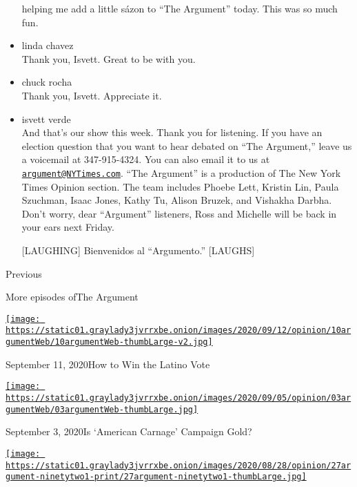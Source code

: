 \begin{itemize}
  helping me add a little sázon to ``The Argument'' today. This was so
  much fun.
\item
  linda chavez\\
  Thank you, Isvett. Great to be with you.
\item
  chuck rocha\\
  Thank you, Isvett. Appreciate it.
\item
  isvett verde\\
  And that's our show this week. Thank you for listening. If you have an
  election question that you want to hear debated on ``The Argument,''
  leave us a voicemail at 347-915-4324. You can also email it to us at
  \href{mailto:argument@NYTimes.com}{\nolinkurl{argument@NYTimes.com}}.
  ``The Argument'' is a production of The New York Times Opinion
  section. The team includes Phoebe Lett, Kristin Lin, Paula Szuchman,
  Isaac Jones, Kathy Tu, Alison Bruzek, and Vishakha Darbha. Don't
  worry, dear ``Argument'' listeners, Ross and Michelle will be back in
  your ears next Friday.

  {[}LAUGHING{]} Bienvenidos al ``Argumento.'' {[}LAUGHS{]}
\end{itemize}

Previous

More episodes ofThe Argument

\href{https://www.nytimes3xbfgragh.onion/2020/09/11/opinion/the-argument-latino-2020-vote.html?action=click\&module=audio-series-bar\&region=header\&pgtype=Article}{\texttt{[image: https://static01.graylady3jvrrxbe.onion/images/2020/09/12/opinion/10argumentWeb/10argumentWeb-thumbLarge-v2.jpg]}}

September 11, 2020How to Win the Latino Vote

\href{https://www.nytimes3xbfgragh.onion/2020/09/03/opinion/the-argument-trump-biden-kenosha-portland.html?action=click\&module=audio-series-bar\&region=header\&pgtype=Article}{\texttt{[image: https://static01.graylady3jvrrxbe.onion/images/2020/09/05/opinion/03argumentWeb/03argumentWeb-thumbLarge.jpg]}}

September 3, 2020Is `American Carnage' Campaign Gold?

\href{https://www.nytimes3xbfgragh.onion/2020/08/27/opinion/the-argument-republican-convention-trump.html?action=click\&module=audio-series-bar\&region=header\&pgtype=Article}{\texttt{[image: https://static01.graylady3jvrrxbe.onion/images/2020/08/28/opinion/27argument-ninetytwo1-print/27argument-ninetytwo1-thumbLarge.jpg]}}

